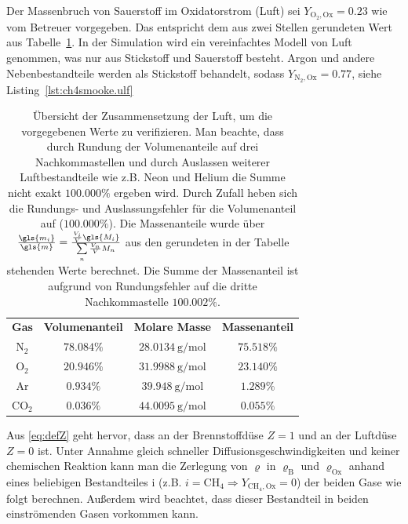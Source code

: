 \label{pg:aircomposition}
Der Massenbruch von Sauerstoff im Oxidatorstrom (Luft) sei $Y_{\mathrm{O}_2,\text{Ox}}=0.23$ wie vom Betreuer vorgegeben. Das entspricht dem aus zwei Stellen gerundeten Wert aus Tabelle~\ref{tbl:luft}. In der Simulation wird ein vereinfachtes Modell von Luft genommen, was nur aus Stickstoff und Sauerstoff besteht. Argon und andere Nebenbestandteile werden als Stickstoff behandelt, sodass $Y_{\mathrm{N}_2,\text{Ox}}=0.77$, siehe Listing~\ref{lst:ch4smooke.ulf} \\
\begin{table}[H]
    \begin{center}\begin{tabular}{cccc}
    \textbf{Gas}    & \textbf{Volumenanteil}\cite[13]{moeller2003luft}\cite{pseiupac} & \textbf{Molare Masse}\cite{nistwebbook} & \textbf{Massenanteil} \\
    $\mathrm{N}_2 $  &  $78.084\%$  &  $\SI{28.0134}{\gram\per\mole}$  &  $75.518\%$    \\
    $\mathrm{O}_2 $  &  $20.946\%$  &  $\SI{31.9988}{\gram\per\mole}$  &  $23.140\%$    \\
    $\mathrm{Ar}  $  &  $ 0.934\%$  &  $\SI{39.948 }{\gram\per\mole}$  &  $ 1.289\%$    \\
    $\mathrm{CO}_2$  &  $ 0.036\%$  &  $\SI{44.0095}{\gram\per\mole}$  &  $ 0.055\%$    \\
    \end{tabular}\end{center}
    \caption{Übersicht der Zusammensetzung der Luft, um die vorgegebenen Werte zu verifizieren. Man beachte, dass durch Rundung der Volumenanteile auf drei Nachkommastellen und durch Auslassen weiterer Luftbestandteile wie z.B. Neon und Helium die Summe nicht exakt $100.000\%$ ergeben wird. Durch Zufall heben sich die Rundungs- und Auslassungsfehler für die Volumenanteil auf ($100.000\%$). Die Massenanteile wurde über $\frac{\gls{m_i}}{\gls{m}} = \frac{ \frac{V_i}{V} \gls{M_i} }{ \sum\limits_n \frac{V_n}{V} M_n }$ aus den gerundeten in der Tabelle stehenden Werte berechnet. Die Summe der Massenanteil ist aufgrund von Rundungsfehler auf die dritte Nachkommastelle $100.002\%$.}
    \label{tbl:luft}
\end{table}
Aus \autoref{eq:defZ} geht hervor, dass an der Brennstoffdüse $Z=1$ und an der Luftdüse $Z=0$ ist. Unter Annahme gleich schneller Diffusionsgeschwindigkeiten und keiner chemischen Reaktion kann man die Zerlegung von $\varrho$ in $\varrho_\text{B}$ und $\varrho_\text{Ox}$ anhand eines beliebigen Bestandteiles \gls{i} (z.B. $i=\mathrm{CH}_4 \Rightarrow Y_{\mathrm{CH}_4,\text{Ox}}=0$) der beiden Gase wie folgt berechnen. Außerdem wird beachtet, dass dieser Bestandteil in beiden einströmenden Gasen vorkommen kann.
